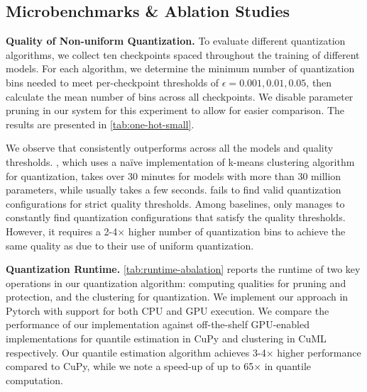 \subsection{Microbenchmarks \& Ablation Studies}
\label{sec:ablations}







\noindent\textbf{{Quality of Non-uniform Quantization.}} To evaluate different quantization algorithms, we collect ten checkpoints spaced throughout the training of different models. For each algorithm, we determine the minimum number of quantization bins needed to meet per-checkpoint thresholds of $\epsilon=0.001, 0.01, 0.05$, then calculate the mean number of bins across all checkpoints. We disable parameter pruning in our system for this experiment to allow for easier comparison. The results are presented in  \cref{tab:one-hot-small}. 

We observe that \sys consistently outperforms across all the models and quality thresholds. \GOBO, which uses a na\"ive implementation of k-means clustering algorithm for quantization, takes over 30 minutes for models with more than 30 million parameters, while \sys usually takes a few seconds. \QD fails to find valid quantization configurations for strict quality thresholds. Among baselines, only \CNR manages to constantly find quantization configurations that satisfy the quality thresholds. However, it requires a 2-4$\times$ higher number of quantization bins to achieve the same quality as \sys due to their use of uniform quantization.


\noindent\textbf{{Quantization Runtime.}} \cref{tab:runtime-abalation} reports the runtime of two key operations in our quantization algorithm: computing qualities for pruning and protection, and the \kmeans clustering for quantization. We implement our approach in Pytorch with support for both CPU and GPU execution. We compare the performance of our implementation against off-the-shelf GPU-enabled implementations for quantile estimation in CuPy and \kmeans clustering in CuML respectively. Our quantile estimation algorithm achieves 3-4$\times$ higher performance compared to CuPy, while we note a speed-up of up to 65$\times$ in quantile computation. 









